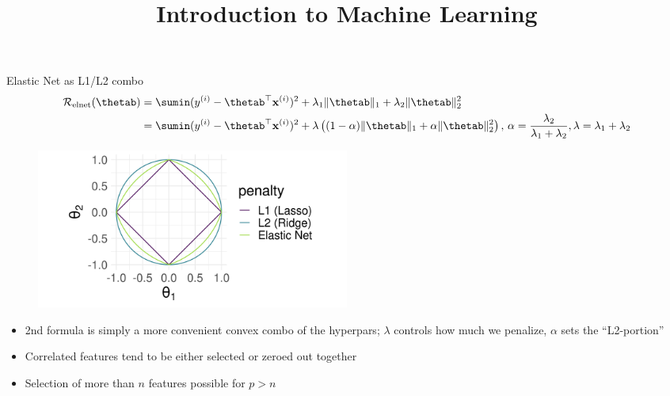 \documentclass[11pt,compress,t,notes=noshow, xcolor=table]{beamer}
\title{Introduction to Machine Learning}
\begin{document}

\begin{vbframe}{Elastic Net as L1/L2 combo }
\vspace{-0.7cm}
\small{
\begin{align*}
\mathcal{R}_{\text{elnet}}(\thetab) &=  \sumin (\yi - \thetab^\top \xi)^2 + \lambda_1 \|\thetab\|_1 + \lambda_2 \|\thetab\|_2^2 \\
&= \sumin (\yi - \thetab^\top \xi)^2 + \lambda \left( (1-\alpha) \|\thetab\|_1 + \alpha \|\thetab\|_2^2\right),\, \alpha=\frac{\lambda_2}{\lambda_1+\lambda_2}, \lambda=\lambda_1+\lambda_2
\end{align*}}
\begin{figure}
\vspace{-0.3cm}
\includegraphics[width=0.5\textwidth]{figure/lasso_ridge_enet_2d.png}\\
\end{figure}
\vspace{-0.3cm}
\begin{itemize}
\item 2nd formula is simply a more convenient convex combo of the hyperpars;
    $\lambda$ controls how much we penalize, $\alpha$ sets the ``L2-portion''
\item Correlated features tend to be either selected or zeroed out together
\item Selection of more than $n$ features possible for $p>n$
\end{itemize}
\end{vbframe}
\end{document}
